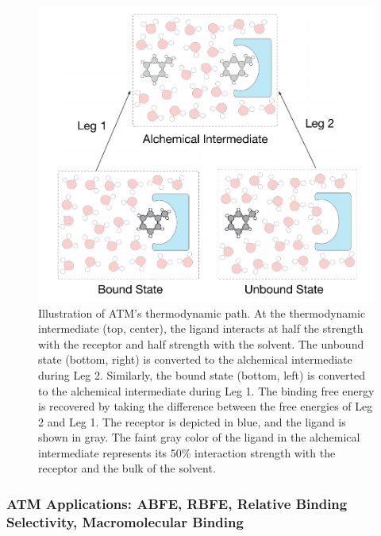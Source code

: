 \documentclass[9pt,bestpractices]{livecoms}
\begin{document}
\begin{figure}[h!]
    \centering
    \includegraphics[width=0.95\linewidth]
    {paper/figures_atm/atm_alchemical_intermediate.pdf}
    \caption{Illustration of ATM's thermodynamic path. At the thermodynamic intermediate (top, center), the ligand interacts at half the strength with the receptor and half strength with the solvent. The unbound state (bottom, right) is converted to the alchemical intermediate during Leg 2. Similarly, the bound state (bottom, left) is converted to the alchemical intermediate during Leg 1. The binding free energy is recovered by taking the difference between the free energies of Leg 2 and Leg 1. The receptor is depicted in blue, and the ligand is shown in gray. The faint gray color of the ligand in the alchemical intermediate represents its 50\% interaction strength with the receptor and the bulk of the solvent.}
    \label{fig:atm_alchemical_intermediate}
\end{figure}


\subsubsection{ATM Applications: ABFE, RBFE, Relative Binding Selectivity, Macromolecular Binding}
\end{document}
